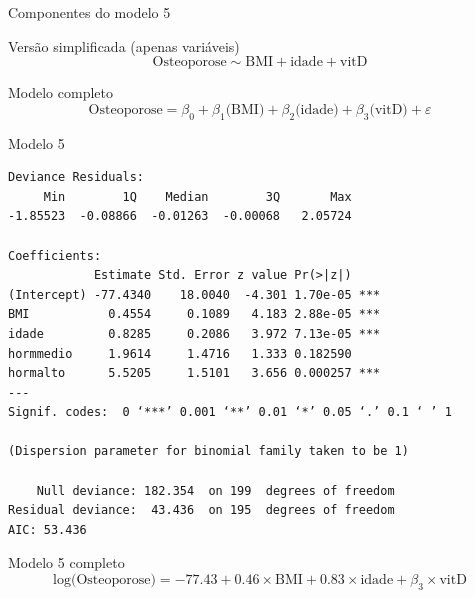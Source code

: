 \documentclass{beamer}
\begin{document}
\begin{frame}{\scriptsize Componentes do modelo 5}
  \begin{block}{\footnotesize Versão simplificada (apenas variáveis)}
    \footnotesize
    \begin{displaymath}
      \text{Osteoporose} \sim \text{BMI} + \text{idade} + \text{vitD}
    \end{displaymath}
  \end{block}
  \bigskip
  \bigskip
  \begin{block}{Modelo completo}
    \footnotesize
    \begin{displaymath}
      \text{Osteoporose} =\beta_0 + \beta_1 \text{(BMI)} + \beta_2 \text{(idade)} + \beta_3 \text{(vitD)} +\varepsilon
    \end{displaymath}
  \end{block}
  \vfill
\end{frame}

\begin{frame}[fragile]{\scriptsize }
  \begin{center}
    \begin{exampleblock}{Modelo 5}
      \tiny
\begin{verbatim}
Deviance Residuals: 
     Min        1Q    Median        3Q       Max  
-1.85523  -0.08866  -0.01263  -0.00068   2.05724  

Coefficients:
            Estimate Std. Error z value Pr(>|z|)    
(Intercept) -77.4340    18.0040  -4.301 1.70e-05 ***
BMI           0.4554     0.1089   4.183 2.88e-05 ***
idade         0.8285     0.2086   3.972 7.13e-05 ***
hormmedio     1.9614     1.4716   1.333 0.182590    
hormalto      5.5205     1.5101   3.656 0.000257 ***
---
Signif. codes:  0 ‘***’ 0.001 ‘**’ 0.01 ‘*’ 0.05 ‘.’ 0.1 ‘ ’ 1

(Dispersion parameter for binomial family taken to be 1)

    Null deviance: 182.354  on 199  degrees of freedom
Residual deviance:  43.436  on 195  degrees of freedom
AIC: 53.436
\end{verbatim}
    \end{exampleblock}
  \begin{exampleblock}{Modelo 5 completo}
    \footnotesize
    \begin{displaymath}
      \text{log(Osteoporose)} =-77.43 + 0.46 \times\text{BMI} + 0.83 \times\text{idade} + \beta_3 \times\text{vitD}
    \end{displaymath}
  \end{exampleblock}
  \end{center}
\end{frame}
\end{document}
